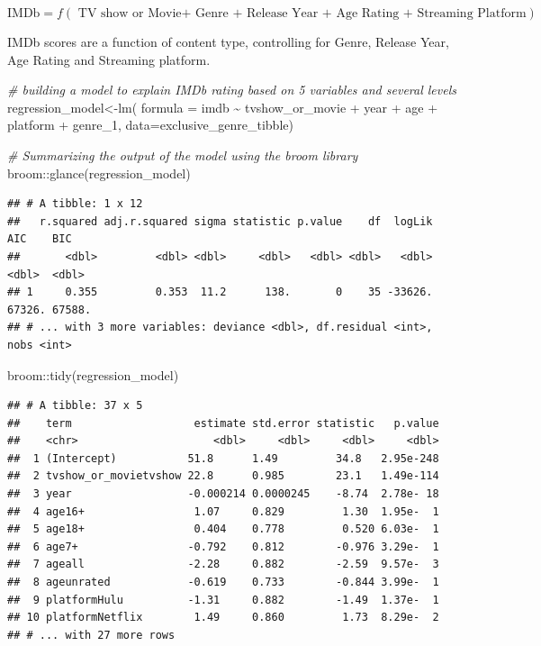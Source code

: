 \documentclass[
]{article}
\newenvironment{Shaded}{\begin{snugshade}}{\end{snugshade}}
\newcommand{\AttributeTok}[1]{\textcolor[rgb]{0.77,0.63,0.00}{#1}}
\newcommand{\CommentTok}[1]{\textcolor[rgb]{0.56,0.35,0.01}{\textit{#1}}}
\newcommand{\FunctionTok}[1]{\textcolor[rgb]{0.00,0.00,0.00}{#1}}
\newcommand{\NormalTok}[1]{#1}
\newcommand{\OtherTok}[1]{\textcolor[rgb]{0.56,0.35,0.01}{#1}}
\newcommand{\SpecialCharTok}[1]{\textcolor[rgb]{0.00,0.00,0.00}{#1}}
\begin{document}
\[
\text{IMDb} = f(\text{ TV show or Movie+ Genre + Release Year + Age Rating  + Streaming Platform})
\]

IMDb scores are a function of content type, controlling for Genre,
Release Year, Age Rating and Streaming platform.

\begin{Shaded}
\begin{Highlighting}[]
\CommentTok{\# building a model to explain IMDb rating based on 5 variables and several levels}
\NormalTok{regression\_model}\OtherTok{\textless{}{-}}\FunctionTok{lm}\NormalTok{(}
  \AttributeTok{formula =}\NormalTok{ imdb }\SpecialCharTok{\textasciitilde{}}\NormalTok{ tvshow\_or\_movie }
  \SpecialCharTok{+}\NormalTok{ year }
  \SpecialCharTok{+}\NormalTok{ age }
  \SpecialCharTok{+}\NormalTok{ platform}
  \SpecialCharTok{+}\NormalTok{ genre\_1, }
  \AttributeTok{data=}\NormalTok{exclusive\_genre\_tibble)}

\CommentTok{\# Summarizing the output of the model using the broom library}
\NormalTok{broom}\SpecialCharTok{::}\FunctionTok{glance}\NormalTok{(regression\_model)}
\end{Highlighting}
\end{Shaded}

\begin{verbatim}
## # A tibble: 1 x 12
##   r.squared adj.r.squared sigma statistic p.value    df  logLik    AIC    BIC
##       <dbl>         <dbl> <dbl>     <dbl>   <dbl> <dbl>   <dbl>  <dbl>  <dbl>
## 1     0.355         0.353  11.2      138.       0    35 -33626. 67326. 67588.
## # ... with 3 more variables: deviance <dbl>, df.residual <int>, nobs <int>
\end{verbatim}

\begin{Shaded}
\begin{Highlighting}[]
\NormalTok{broom}\SpecialCharTok{::}\FunctionTok{tidy}\NormalTok{(regression\_model)}
\end{Highlighting}
\end{Shaded}

\begin{verbatim}
## # A tibble: 37 x 5
##    term                   estimate std.error statistic   p.value
##    <chr>                     <dbl>     <dbl>     <dbl>     <dbl>
##  1 (Intercept)           51.8      1.49         34.8   2.95e-248
##  2 tvshow_or_movietvshow 22.8      0.985        23.1   1.49e-114
##  3 year                  -0.000214 0.0000245    -8.74  2.78e- 18
##  4 age16+                 1.07     0.829         1.30  1.95e-  1
##  5 age18+                 0.404    0.778         0.520 6.03e-  1
##  6 age7+                 -0.792    0.812        -0.976 3.29e-  1
##  7 ageall                -2.28     0.882        -2.59  9.57e-  3
##  8 ageunrated            -0.619    0.733        -0.844 3.99e-  1
##  9 platformHulu          -1.31     0.882        -1.49  1.37e-  1
## 10 platformNetflix        1.49     0.860         1.73  8.29e-  2
## # ... with 27 more rows
\end{verbatim}
\end{document}
